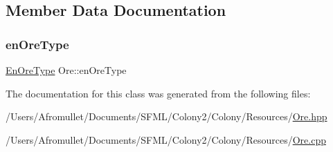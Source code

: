 \subsection{Member Data Documentation}
\mbox{\label{class_ore_a834b6f726ecb7ce8e0904fd58f551a16}} 
\subsubsection{\texorpdfstring{en\+Ore\+Type}{enOreType}}
{\footnotesize\ttfamily \mbox{\hyperlink{_ore_8hpp_a4dd6f8b19eecee73049dd69be5803f14}{En\+Ore\+Type}} Ore\+::en\+Ore\+Type\hspace{0.3cm}{\ttfamily [private]}}



The documentation for this class was generated from the following files\+:\begin{DoxyCompactItemize}
\item 
/\+Users/\+Afromullet/\+Documents/\+S\+F\+M\+L/\+Colony2/\+Colony/\+Resources/\mbox{\hyperlink{_ore_8hpp}{Ore.\+hpp}}\item 
/\+Users/\+Afromullet/\+Documents/\+S\+F\+M\+L/\+Colony2/\+Colony/\+Resources/\mbox{\hyperlink{_ore_8cpp}{Ore.\+cpp}}\end{DoxyCompactItemize}
